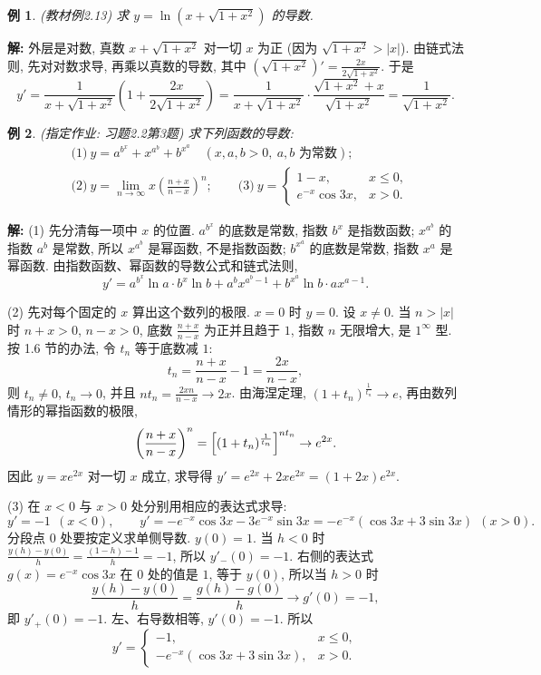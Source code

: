 \documentclass[UTF8,openany]{ctexbook}
\theoremstyle{chinesetextbook}
\newtheorem{example}{例}[section]
\newenvironment{cnsolution}{\par\indent\textbf{解:} \ignorespaces}{\par}
\begin{document}
\begin{example}\label{ex:c2-2-13}
\textnormal{(教材例2.13)} 求 $y=\ln\left(x+\sqrt{1+x^2}\right)$ 的导数.
\end{example}
\begin{cnsolution}
外层是对数, 真数 $x+\sqrt{1+x^2}$ 对一切 $x$ 为正 (因为 $\sqrt{1+x^2}>|x|$). 由链式法则, 先对对数求导, 再乘以真数的导数, 其中 $\displaystyle\left(\sqrt{1+x^2}\right)'=\frac{2x}{2\sqrt{1+x^2}}$. 于是
\[
y'=\frac1{x+\sqrt{1+x^2}}\left(1+\frac{2x}{2\sqrt{1+x^2}}\right)=\frac1{x+\sqrt{1+x^2}}\cdot\frac{\sqrt{1+x^2}+x}{\sqrt{1+x^2}}=\frac1{\sqrt{1+x^2}}.
\]
\end{cnsolution}
\begin{example}\label{ex:c2-h2-3}
\textnormal{(指定作业: 习题2.2第3题)} 求下列函数的导数:
\[
\begin{aligned}
&\text{(1)}\ y=a^{b^x}+x^{a^b}+b^{x^a}\quad(x,a,b>0,\ a,b\text{ 为常数});\\
&\text{(2)}\ y=\lim_{n\to\infty}x\left(\frac{n+x}{n-x}\right)^n;\qquad\text{(3)}\ y=\begin{cases}1-x,&x\le0,\\e^{-x}\cos3x,&x>0.\end{cases}
\end{aligned}
\]
\end{example}
\begin{cnsolution}
(1) 先分清每一项中 $x$ 的位置. $a^{b^x}$ 的底数是常数, 指数 $b^x$ 是指数函数; $x^{a^b}$ 的指数 $a^b$ 是常数, 所以 $x^{a^b}$ 是幂函数, 不是指数函数; $b^{x^a}$ 的底数是常数, 指数 $x^a$ 是幂函数. 由指数函数、幂函数的导数公式和链式法则,
\[
y'=a^{b^x}\ln a\cdot b^x\ln b+a^bx^{a^b-1}+b^{x^a}\ln b\cdot ax^{a-1}.
\]

(2) 先对每个固定的 $x$ 算出这个数列的极限. $x=0$ 时 $y=0$. 设 $x\ne0$. 当 $n>|x|$ 时 $n+x>0$, $n-x>0$, 底数 $\displaystyle\frac{n+x}{n-x}$ 为正并且趋于 $1$, 指数 $n$ 无限增大, 是 $1^\infty$ 型. 按 1.6 节的办法, 令 $t_n$ 等于底数减 $1$:
\[
t_n=\frac{n+x}{n-x}-1=\frac{2x}{n-x},
\]
则 $t_n\ne0$, $t_n\to0$, 并且 $\displaystyle nt_n=\frac{2xn}{n-x}\to2x$. 由海涅定理, $(1+t_n)^{\frac1{t_n}}\to e$, 再由数列情形的幂指函数的极限,
\[
\left(\frac{n+x}{n-x}\right)^n=\Bigl[(1+t_n)^{\frac1{t_n}}\Bigr]^{nt_n}\to e^{2x}.
\]
因此 $y=xe^{2x}$ 对一切 $x$ 成立, 求导得 $y'=e^{2x}+2xe^{2x}=(1+2x)e^{2x}$.

(3) 在 $x<0$ 与 $x>0$ 处分别用相应的表达式求导:
\[
y'=-1\ \ (x<0),\qquad y'=-e^{-x}\cos3x-3e^{-x}\sin3x=-e^{-x}(\cos3x+3\sin3x)\ \ (x>0).
\]
分段点 $0$ 处要按定义求单侧导数. $y(0)=1$. 当 $h<0$ 时 $\displaystyle\frac{y(h)-y(0)}h=\frac{(1-h)-1}h=-1$, 所以 $y'_-(0)=-1$. 右侧的表达式 $g(x)=e^{-x}\cos3x$ 在 $0$ 处的值是 $1$, 等于 $y(0)$, 所以当 $h>0$ 时
\[
\frac{y(h)-y(0)}h=\frac{g(h)-g(0)}h\to g'(0)=-1,
\]
即 $y'_+(0)=-1$. 左、右导数相等, $y'(0)=-1$. 所以
\[
y'=\begin{cases}-1,&x\le0,\\-e^{-x}(\cos3x+3\sin3x),&x>0.\end{cases}
\]
\end{cnsolution}
\end{document}
